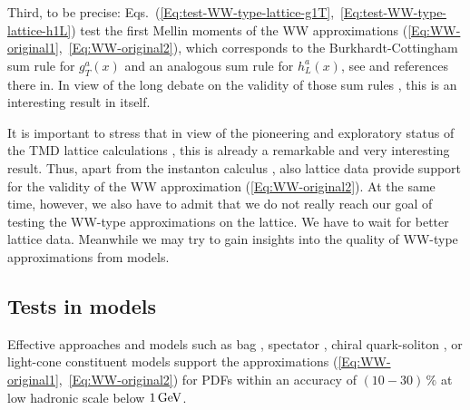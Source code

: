 \documentclass[a4paper,11pt]{article}
\begin{document}
Third, to be precise:
Eqs.~(\ref{Eq:test-WW-type-lattice-g1T},~\ref{Eq:test-WW-type-lattice-h1L})
test the first Mellin moments of the WW approximations
(\ref{Eq:WW-original1},~\ref{Eq:WW-original2}), which corresponds to the
Burkhardt-Cottingham sum rule for $g_T^a(x)$ and an analogous sum rule for
$h_L^a(x)$, see \cite{Jaffe:1996zw} and references there in.
In view of the long debate on the validity of those sum rules
\cite{Burkardt:2001iy,Bass:2003vp,Efremov:2002qh}, this is
an interesting result in itself.

It is important to stress that in view of the pioneering and
exploratory status of the TMD lattice calculations
\cite{Hagler:2009mb,Musch:2010ka}, this is already a remarkable and very
interesting result. Thus, apart from the instanton calculus
\cite{Dressler:1999hc}, also lattice data provide support for
the validity of the WW approximation (\ref{Eq:WW-original2}).
At the same time, however, we also have to admit that we do
not really reach our goal of testing the WW-type approximations
on the lattice. We have to wait for better lattice data.
Meanwhile we may try to gain insights into the quality of
WW-type approximations from models.




\subsection{Tests in models}
\label{Sec-3.6:models}

Effective approaches and models such as bag
\cite{Jaffe:1991ra,Stratmann:1993aw,Signal:1996ct,Avakian:2010br},
spectator \cite{Jakob:1997wg}, chiral quark-soliton
\cite{Wakamatsu:2000ex}, or light-cone
constituent \cite{Pasquini:2008ax,Lorce:2011dv} models
support the approximations (\ref{Eq:WW-original1},~\ref{Eq:WW-original2})
for PDFs within an accuracy of $(10-30)\,\%$ at low hadronic scale
below $1\,{\rm GeV}$.
\end{document}

